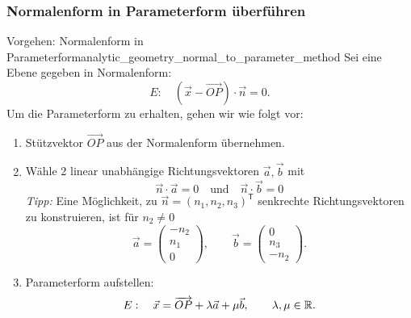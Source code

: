 \subsubsection{Normalenform in Parameterform überführen}

\begin{KeyPointBox}{Vorgehen: Normalenform in Parameterform}{analytic_geometry_normal_to_parameter_method}
    Sei eine Ebene gegeben in Normalenform:
    \[
      E:\quad (\vec x-\overrightarrow{OP})\cdot\vec n=0.
    \]
    Um die Parameterform zu erhalten, gehen wir wie folgt vor:
    \begin{enumerate}[leftmargin=1.6em,itemsep=0.25em]
      \item Stützvektor $\overrightarrow{OP}$ aus der Normalenform übernehmen.
      \item Wähle 2 linear unabhängige Richtungsvektoren $\vec a,\vec b$ mit
        \[
          \vec n\cdot\vec a = 0\quad\text{und}\quad \vec n\cdot\vec b=0
        \]
        \textit{Tipp:} Eine Möglichkeit, zu
        $\vec n=(n_1,n_2,n_3)^{\mathsf T}$ senkrechte Richtungsvektoren zu
        konstruieren, ist für $n_2\neq0$
        \[
          \vec a=\begin{pmatrix}-n_2\\n_1\\0\end{pmatrix},
          \qquad
          \vec b=\begin{pmatrix}0\\n_3\\-n_2\end{pmatrix}.
        \]
      \item Parameterform aufstellen:
      \[
        E:\quad \vec x=\overrightarrow{OP}+\lambda\vec a+\mu\vec b,
        \qquad \lambda,\mu\in\mathbb{R}.
      \]
    \end{enumerate}
  \end{KeyPointBox}

